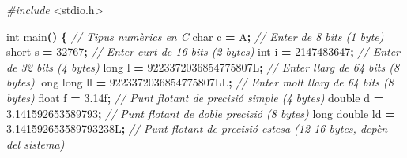 \documentclass[
  12 pt,
  a4paper,
]{article}
\newenvironment{Shaded}{\begin{snugshade}}{\end{snugshade}}
\newcommand{\BuiltInTok}[1]{#1}
\newcommand{\CharTok}[1]{\textcolor[rgb]{0.31,0.60,0.02}{#1}}
\newcommand{\CommentTok}[1]{\textcolor[rgb]{0.56,0.35,0.01}{\textit{#1}}}
\newcommand{\DataTypeTok}[1]{\textcolor[rgb]{0.13,0.29,0.53}{#1}}
\newcommand{\DecValTok}[1]{\textcolor[rgb]{0.00,0.00,0.81}{#1}}
\newcommand{\FloatTok}[1]{\textcolor[rgb]{0.00,0.00,0.81}{#1}}
\newcommand{\ImportTok}[1]{#1}
\newcommand{\NormalTok}[1]{#1}
\newcommand{\OperatorTok}[1]{\textcolor[rgb]{0.81,0.36,0.00}{\textbf{#1}}}
\newcommand{\PreprocessorTok}[1]{\textcolor[rgb]{0.56,0.35,0.01}{\textit{#1}}}
\begin{document}
\begin{Shaded}
\begin{Highlighting}[]
\PreprocessorTok{\#include }\ImportTok{\textless{}stdio.h\textgreater{}}

\DataTypeTok{int}\NormalTok{ main}\OperatorTok{()} \OperatorTok{\{}
    \CommentTok{// Tipus numèrics en C}
    \DataTypeTok{char}\NormalTok{ c }\OperatorTok{=} \CharTok{\textquotesingle{}A\textquotesingle{}}\OperatorTok{;}                    \CommentTok{// Enter de 8 bits (1 byte)}
    \DataTypeTok{short}\NormalTok{ s }\OperatorTok{=} \DecValTok{32767}\OperatorTok{;}                 \CommentTok{// Enter curt de 16 bits (2 bytes)}
    \DataTypeTok{int}\NormalTok{ i }\OperatorTok{=} \DecValTok{2147483647}\OperatorTok{;}              \CommentTok{// Enter de 32 bits (4 bytes)}
    \DataTypeTok{long}\NormalTok{ l }\OperatorTok{=} \DecValTok{9223372036854775807}\BuiltInTok{L}\OperatorTok{;}   \CommentTok{// Enter llarg de 64 bits (8 bytes)}
    \DataTypeTok{long} \DataTypeTok{long}\NormalTok{ ll }\OperatorTok{=} \DecValTok{9223372036854775807}\BuiltInTok{LL}\OperatorTok{;} \CommentTok{// Enter molt llarg de 64 bits (8 bytes)}
    \DataTypeTok{float}\NormalTok{ f }\OperatorTok{=} \FloatTok{3.14}\BuiltInTok{f}\OperatorTok{;}                 \CommentTok{// Punt flotant de precisió simple (4 bytes)}
    \DataTypeTok{double}\NormalTok{ d }\OperatorTok{=} \FloatTok{3.141592653589793}\OperatorTok{;}    \CommentTok{// Punt flotant de doble precisió (8 bytes)}
    \DataTypeTok{long} \DataTypeTok{double}\NormalTok{ ld }\OperatorTok{=} \FloatTok{3.141592653589793238}\BuiltInTok{L}\OperatorTok{;} \CommentTok{// Punt flotant de precisió estesa (12{-}16 bytes, depèn del sistema)}


\end{Highlighting}
\end{Shaded}
\end{document}
